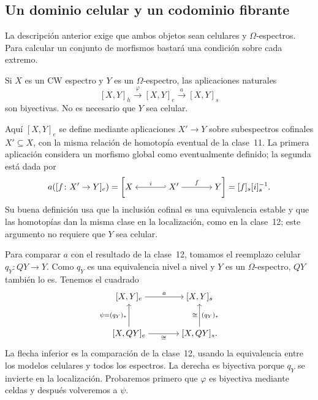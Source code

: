 \subsection{Un dominio celular y un codominio fibrante}

La descripción anterior exige que ambos objetos sean celulares y $\Omega$-espectros. Para calcular un conjunto de morfismos bastará una condición sobre cada extremo.

\begin{prop}\label{prop:c13-comparacion-morfismos}
Si $X$ es un CW espectro y $Y$ es un $\Omega$-espectro, las aplicaciones naturales
\[
[X,Y]_h\xrightarrow{\ \varphi\ }[X,Y]_e
\xrightarrow{\ a\ }[X,Y]_s
\]
son biyectivas. No es necesario que $Y$ sea celular.
\end{prop}

Aquí $[X,Y]_e$ se define mediante aplicaciones $X'\to Y$ sobre subespectros cofinales $X'\subseteq X$, con la misma relación de homotopía eventual de la clase~11. La primera aplicación considera un morfismo global como eventualmente definido; la segunda está dada por
\[
a([f\colon X'\to Y]_e)
=\left[\begin{tikzcd}[cramped,column sep=large]
X & X' \arrow[l,hook',"i"'] \arrow[r,"f"] & Y
\end{tikzcd}\right]
=[f]_s[i]_s^{-1}.
\]
Su buena definición usa que la inclusión cofinal es una equivalencia estable y que las homotopías dan la misma clase en la localización, como en la clase~12; este argumento no requiere que $Y$ sea celular.

Para comparar $a$ con el resultado de la clase~12, tomamos el reemplazo celular $q_Y\colon QY\to Y$. Como $q_Y$ es una equivalencia nivel a nivel y $Y$ es un $\Omega$-espectro, $QY$ también lo es. Tenemos el cuadrado
\[
\begin{tikzcd}[cramped,column sep=large,row sep=large]
{[X,Y]_e} \arrow[r,"a"] & {[X,Y]_s}\\
{[X,QY]_e} \arrow[u,"\psi=(q_Y)_*"] \arrow[r,"\cong"']
& {[X,QY]_s} \arrow[u,"(q_Y)_*"',"\cong"] .
\end{tikzcd}
\]
La flecha inferior es la comparación de la clase~12, usando la equivalencia entre los modelos celulares y todos los espectros. La derecha es biyectiva porque $q_Y$ se invierte en la localización. Probaremos primero que $\varphi$ es biyectiva mediante celdas y después volveremos a $\psi$.

